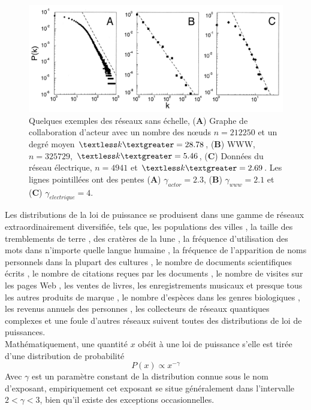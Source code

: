 \begin{figure}[h!]
\centering
\includegraphics[scale=0.3]{./figures/scal-free-reels}
\caption{Quelques exemples des réseaux sans échelle, (\textbf{A}) Graphe de collaboration d'acteur avec un nombre des nœuds
$n=212250$ et un degré moyen $\textless k\textgreater=28.78$, (\textbf{B}) WWW, $n=325729$, $\textless k\textgreater=5.46$,
(\textbf{C}) Données du réseau électrique, $n=4941$ et $\textless k\textgreater=2.69$. Les lignes pointillées ont des pentes
(\textbf{A}) $\gamma_{actor}=2.3$, (\textbf{B}) $\gamma_{www}=2.1$ et (\textbf{C}) $\gamma_{electrique}=4$.}

\label{scal-free-reels}
\end{figure}
Les distributions de la loi de puissance se produisent dans une gamme de réseaux extraordinairement diversifiée, tels que, les populations des  villes \cite{New2005,Aa-al2009}, la taille des tremblements de terre \cite{GuR1944}, des cratères de la lune  \cite{NeI1994}, la fréquence d'utilisation des mots dans n'importe quelle langue humaine \cite{Zipf1949,Estoup1916}, la  fréquence de l'apparition de noms personnels dans la plupart des cultures \cite{ZaM2001}, le nombre de documents scientifiques écrits \cite{LoW1926}, le nombre de citations reçues par les documents \cite{Price1965}, le nombre de visites sur les pages Web \cite{AdH2000}, les ventes de livres, les enregistrements musicaux et presque tous les autres produits de marque \cite{Cox-al1995}, le nombre d'espèces dans les genres biologiques \cite{WilY1922}, les revenus annuels des personnes \cite{Pareto1896}, les collecteurs de réseaux quantiques complexes \cite{BiR2015} et une foule d'autres réseaux suivent toutes des distributions de loi de puissances.\\

Mathématiquement, une quantité $x$ obéit à une loi de puissance s'elle est tirée d'une distribution de probabilité
\begin{equation}
 P(x)\propto x^{-\gamma}
\end{equation}
Avec $\gamma$ est un paramètre constant de la distribution connue sous le nom d'exposant, empiriquement cet exposant se situe
généralement dans l'intervalle $2<\gamma<3$, bien qu'il existe des exceptions occasionnelles.

